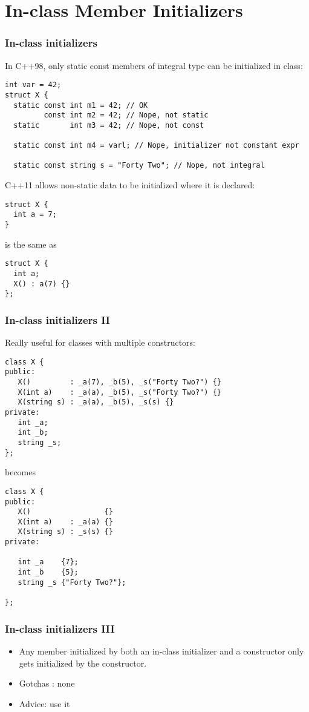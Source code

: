 
\section{In-class Member Initializers}
\begin{frame}[fragile]

\frametitle{In-class initializers}
In C++98, only static const members of integral type can be
initialized in class:
{\scriptsize
\begin{verbatim}
int var = 42;
struct X {
  static const int m1 = 42; // OK
         const int m2 = 42; // Nope, not static
  static       int m3 = 42; // Nope, not const

  static const int m4 = varl; // Nope, initializer not constant expr

  static const string s = "Forty Two"; // Nope, not integral
\end{verbatim}
}
\pause{}
C++11 allows non-static data to be initialized where it is declared:

{\scriptsize
\begin{verbatim}
struct X {
  int a = 7;
}
\end{verbatim}}

is the same as

{\scriptsize
\begin{verbatim}
struct X {
  int a;
  X() : a(7) {}
};
\end{verbatim}
}

\end{frame}


\begin{frame}[fragile]
\frametitle{In-class initializers II}
Really useful for classes with multiple constructors:

{\scriptsize
\begin{verbatim}
class X {
public:
   X()         : _a(7), _b(5), _s("Forty Two?") {}
   X(int a)    : _a(a), _b(5), _s("Forty Two?") {}
   X(string s) : _a(a), _b(5), _s(s) {}
private:
   int _a;
   int _b;
   string _s;
};
\end{verbatim}
}

becomes

{\scriptsize
\begin{verbatim}
class X {
public:
   X()                 {}
   X(int a)    : _a(a) {}
   X(string s) : _s(s) {}
private:

   int _a    {7};
   int _b    {5};
   string _s {"Forty Two?"};

};
\end{verbatim}
}
\end{frame}

\begin{frame}[fragile]
\frametitle{In-class initializers III}
\begin{itemize}
\item Any member initialized by both an in-class initializer and a
constructor only gets initialized by the constructor.
\item Gotchas : none
\item Advice: use it
\end{itemize}


\end{frame}
